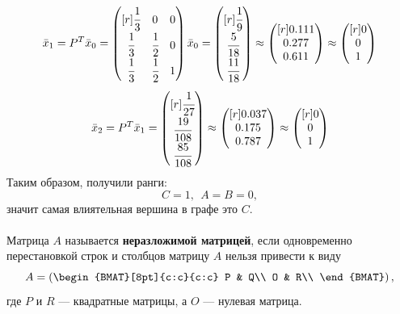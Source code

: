 \documentclass[12pt]{article}
\theoremstyle{definition}
\numberwithin{equation}{section}
\begin{document}
\[\bar x_1 = P^T\bar x_0=\begin{pmatrix}[r]
\cfrac{1}{3} & 0 & 0\\
\cfrac{1}{3} & \cfrac{1}{2} & 0\\
\cfrac{1}{3} & \cfrac{1}{2} & 1\\
\end{pmatrix}\bar x_0 = \begin{pmatrix}[r]
\cfrac{1}{9}\\
\cfrac{5}{18}\\
\cfrac{11}{18}\\
\end{pmatrix} \approx \begin{pmatrix}[r]
0.111\\
0.277\\
0.611\\
\end{pmatrix}\approx \begin{pmatrix}[r]
0\\
0\\
1\\
\end{pmatrix}\]
\[\bar x_2 = P^T\bar x_1= \begin{pmatrix}[r]
\cfrac{1}{27}\\
\cfrac{19}{108}\\
\cfrac{85}{108}\\
\end{pmatrix} \approx \begin{pmatrix}[r]
0.037\\
0.175\\
0.787\\
\end{pmatrix}\approx \begin{pmatrix}[r]
0\\
0\\
1\\
\end{pmatrix}\]
Таким образом, получили ранги:
$$C=1,~~A=B=0,$$
значит самая влиятельная вершина в графе это $C$.\\
\\
Матрица $A$ называется \textbf{неразложимой матрицей}, если одновременно перестановкой строк и столбцов матрицу $A$ нельзя привести к виду
\[ 
A=
\left(
\begin{BMAT}[8pt]{c:c}{c:c}
  P & Q\\
  O & R\\
\end{BMAT} 
\right),
\]
где $P$ и $R$ --- квадратные матрицы, а $O$ --- нулевая матрица.\\
\end{document}
